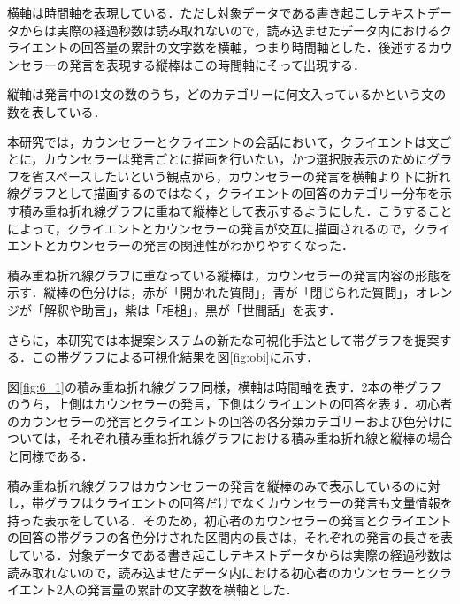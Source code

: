 \documentclass[shuuron]{kuee}
\begin{document}
横軸は時間軸を表現している．ただし対象データである書き起こしテキストデータからは実際の経過秒数は読み取れないので，読み込ませたデータ内におけるクライエントの回答量の累計の文字数を横軸，つまり時間軸とした．後述するカウンセラーの発言を表現する縦棒はこの時間軸にそって出現する．

縦軸は発言中の1文の数のうち，どのカテゴリーに何文入っているかという文の数を表している．



本研究では，カウンセラーとクライエントの会話において，クライエントは文ごとに，カウンセラーは発言ごとに描画を行いたい，かつ選択肢表示のためにグラフを省スペースしたいという観点から，カウンセラーの発言を横軸より下に折れ線グラフとして描画するのではなく，クライエントの回答のカテゴリー分布を示す積み重ね折れ線グラフに重ねて縦棒として表示するようにした．こうすることによって，クライエントとカウンセラーの発言が交互に描画されるので，クライエントとカウンセラーの発言の関連性がわかりやすくなった．

積み重ね折れ線グラフに重なっている縦棒は，カウンセラーの発言内容の形態を示す．縦棒の色分けは，赤が「開かれた質問」，青が「閉じられた質問」，オレンジが「解釈や助言」，紫は「相槌」，黒が「世間話」を表す．





さらに，本研究では本提案システムの新たな可視化手法として帯グラフを提案する．この帯グラフによる可視化結果を図\ref{fig:obi}に示す．

図\ref{fig:6_1}の積み重ね折れ線グラフ同様，横軸は時間軸を表す．2本の帯グラフのうち，上側はカウンセラーの発言，下側はクライエントの回答を表す．初心者のカウンセラーの発言とクライエントの回答の各分類カテゴリーおよび色分けについては，それぞれ積み重ね折れ線グラフにおける積み重ね折れ線と縦棒の場合と同様である．

積み重ね折れ線グラフはカウンセラーの発言を縦棒のみで表示しているのに対し，帯グラフはクライエントの回答だけでなくカウンセラーの発言も文量情報を持った表示をしている．そのため，初心者のカウンセラーの発言とクライエントの回答の帯グラフの各色分けされた区間内の長さは，それぞれの発言の長さを表している．対象データである書き起こしテキストデータからは実際の経過秒数は読み取れないので，読み込ませたデータ内における初心者のカウンセラーとクライエント2人の発言量の累計の文字数を横軸とした．
\end{document}
